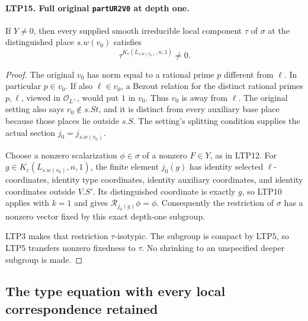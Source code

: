 \paragraph{LTP15. Full original \texttt{partUR2V0} at depth one.}
\label{claim:LTP15}
If \(Y\ne0\), then every supplied smooth irreducible local
component \(\tau\) of \(\sigma\) at the distinguished place
\(s.w(v_0)\) satisfies
\[
                     \tau^{K_c(L_{s.w(v_0)},n,1)}\ne0 .
\]
\begin{proof}
The original \(v_0\) has norm equal to a rational prime \(p\)
different from \(\ell\).  In particular \(p\in v_0\).
If also \(\ell\in v_0\), a Bezout relation for the distinct
rational primes \(p,\ell\), viewed in \(\mathcal O_{L^+}\),
would put \(1\) in \(v_0\).  Thus \(v_0\) is away from \(\ell\).
The original setting also says \(v_0\notin s.St\), and it is
distinct from every auxiliary base place because those places
lie outside \(s.S\).  The setting's splitting condition supplies
the actual section \(j_0=j_{s.w(v_0)}\).

Choose a nonzero scalarization \(\phi\in\sigma\) of a nonzero
\(F\in Y\), as in LTP12.  For
\(g\in K_c(L_{s.w(v_0)},n,1)\), the finite element \(j_0(g)\)
has identity selected \(\ell\)-coordinates, identity type
coordinates, identity auxiliary coordinates, and identity
coordinates outside \(V.S'\).  Its distinguished coordinate is
exactly \(g\), so LTP10 applies with \(k=1\) and gives
\(\mathscr R_{j_0(g)}\phi=\phi\).  Consequently the restriction
of \(\sigma\) has a nonzero vector fixed by this exact
depth-one subgroup.

LTP3 makes that restriction \(\tau\)-isotypic.  The subgroup is
compact by LTP5, so LTP5 transfers nonzero fixedness to \(\tau\).
No shrinking to an unspecified deeper subgroup is made.
\end{proof}

\subsection{The type equation with every local correspondence retained}

